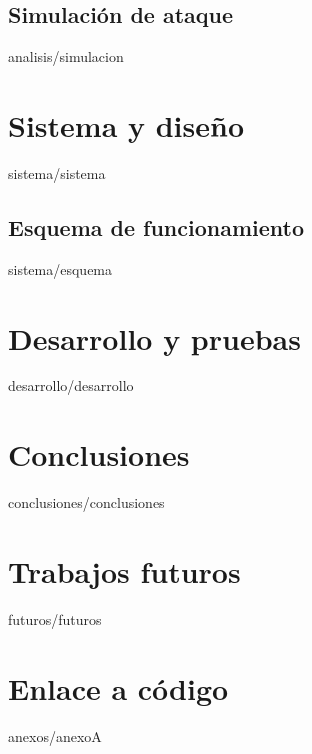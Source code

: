 \documentclass[epsbased,copyright,final,printable,covers,extendedindex,firstnumbered,tfg,gnuplot]{tfgtfmthesisuam}
\begin{document}
  \section{Simulación de ataque\label{SEC:SIMULACION}}{analisis/simulacion}

\chapter{Sistema y diseño\label{CAP:SISTEMA}}{sistema/sistema}
  \section{Esquema de funcionamiento\label{SEC:ESQUEMA}}{sistema/esquema}

\chapter{Desarrollo y pruebas\label{CAP:DESARROLLO}}{desarrollo/desarrollo}

\chapter{Conclusiones\label{CAP:CONCLUSIONES}}{conclusiones/conclusiones}

\chapter{Trabajos futuros\label{CAP:FUTUROS}}{futuros/futuros}

\appendix

\chapter{Enlace a código\label{CAP:ACRONIMOS}}{anexos/anexoA}
\end{document}
